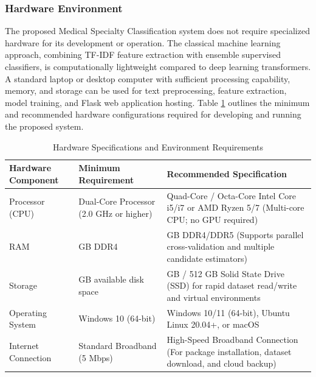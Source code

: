 \FloatBarrier

\subsubsection{Hardware Environment}
The proposed Medical Specialty Classification system does not require specialized hardware for its development or operation. The classical machine learning approach, combining TF-IDF feature extraction with ensemble supervised classifiers, is computationally lightweight compared to deep learning transformers. A standard laptop or desktop computer with sufficient processing capability, memory, and storage can be used for text preprocessing, feature extraction, model training, and Flask web application hosting. Table \ref{tab:hardware_environment} outlines the minimum and recommended hardware configurations required for developing and running the proposed system.

\begin{table}[H]
\centering
\small
\renewcommand{\arraystretch}{1.15}
\setlength{\tabcolsep}{5pt}
\begin{tabularx}{\linewidth}{|>{\raggedright\arraybackslash}p{3.5cm}|>{\raggedright\arraybackslash}p{4.2cm}|>{\raggedright\arraybackslash}X|}
\hline
\textbf{Hardware Component} & \textbf{Minimum Requirement} & \textbf{Recommended Specification} \\
\hline
Processor (CPU) & Dual-Core Processor (2.0 GHz or higher) & Quad-Core / Octa-Core Intel Core i5/i7 or AMD Ryzen 5/7 (Multi-core CPU; no GPU required) \\
\hline
RAM & 8 GB DDR4 & 16 GB DDR4/DDR5 (Supports parallel cross-validation and multiple candidate estimators) \\
\hline
Storage & 20 GB available disk space & 256 GB / 512 GB Solid State Drive (SSD) for rapid dataset read/write and virtual environments \\
\hline
Operating System & Windows 10 (64-bit) & Windows 10/11 (64-bit), Ubuntu Linux 20.04+, or macOS \\
\hline
Internet Connection & Standard Broadband (5 Mbps) & High-Speed Broadband Connection (For package installation, dataset download, and cloud backup) \\
\hline
\end{tabularx}
\caption{Hardware Specifications and Environment Requirements}
\label{tab:hardware_environment}
\end{table}


